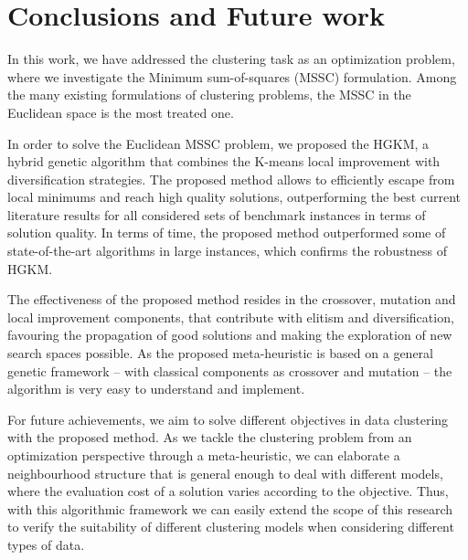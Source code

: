 \chapter{Conclusions and Future work}

In this work, we have addressed the clustering task as an optimization problem, where we investigate the Minimum sum-of-squares (MSSC) formulation. Among the many existing formulations of clustering problems, the MSSC in the Euclidean space is the most treated one.

In order to solve the Euclidean MSSC problem, we proposed the HGKM, a hybrid genetic algorithm that combines the K-means local improvement with diversification strategies. The proposed method allows to efficiently escape from local minimums and reach high quality solutions, outperforming the best current literature results for all considered sets of benchmark instances in terms of solution quality. In terms of time, the proposed method outperformed some of state-of-the-art algorithms in large instances, which confirms the robustness of HGKM.

The effectiveness of the proposed method resides in the crossover, mutation and local improvement components, that contribute with elitism and diversification, favouring the propagation of good solutions and making the exploration of new search spaces possible. As the proposed meta-heuristic is based on a general genetic framework -- with classical components as crossover and mutation -- the algorithm is very easy to understand and implement.

For future achievements, we aim to solve different objectives in data clustering with the proposed method. As we tackle the clustering problem from an optimization perspective through a meta-heuristic, we can elaborate a neighbourhood structure that is general enough to deal with different models, where the evaluation cost of a solution varies according to the objective. Thus, with this algorithmic framework we can easily extend the scope of this research to verify the suitability of different clustering models when considering different types of data.